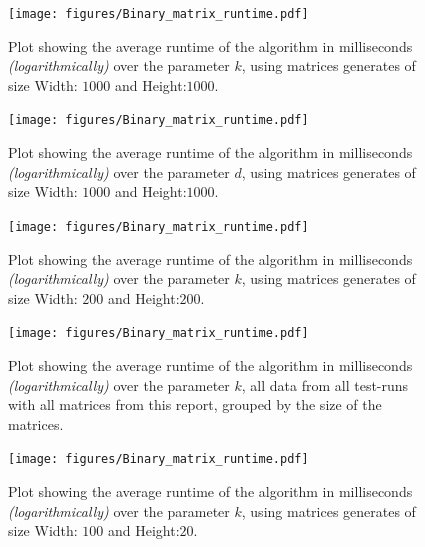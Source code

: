 \documentclass{beamer}
\begin{document}
\begin{frame}
  \begin{figure}
    \centering
    \texttt{[image: figures/Binary\_matrix\_runtime.pdf]}
    \caption{Plot showing the average runtime of the algorithm in milliseconds \textit{(logarithmically)}
      over the parameter $k$, using matrices generates of size Width: $1000$ and Height:$1000$.}
  \end{figure}
\end{frame}

\begin{frame}
  \begin{figure}
    \centering
    \texttt{[image: figures/Binary\_matrix\_runtime.pdf]}
    \caption{Plot showing the average runtime of the algorithm in milliseconds \textit{(logarithmically)}
      over the parameter $d$, using matrices generates of size Width: $1000$ and Height:$1000$.}
  \end{figure}
\end{frame}

\begin{frame}
  \begin{figure}
    \centering
    \texttt{[image: figures/Binary\_matrix\_runtime.pdf]}
    \caption{Plot showing the average runtime of the algorithm in milliseconds \textit{(logarithmically)}
      over the parameter $k$, using matrices generates of size Width: $200$ and Height:$200$.}
  \end{figure}
\end{frame}

\begin{frame}
  \begin{figure}
    \centering
    \texttt{[image: figures/Binary\_matrix\_runtime.pdf]}
    \caption{Plot showing the average runtime of the algorithm in milliseconds \textit{(logarithmically)}
      over the parameter $k$, all data from all test-runs with all matrices from this report, grouped by
      the size of the matrices.}
  \end{figure}
\end{frame}

\begin{frame}
  \begin{figure}
    \centering
    \texttt{[image: figures/Binary\_matrix\_runtime.pdf]}
    \caption{Plot showing the average runtime of the algorithm in milliseconds \textit{(logarithmically)}
      over the parameter $k$, using matrices generates of size Width: $100$ and Height:$20$.}
  \end{figure}
\end{frame}
\end{document}
